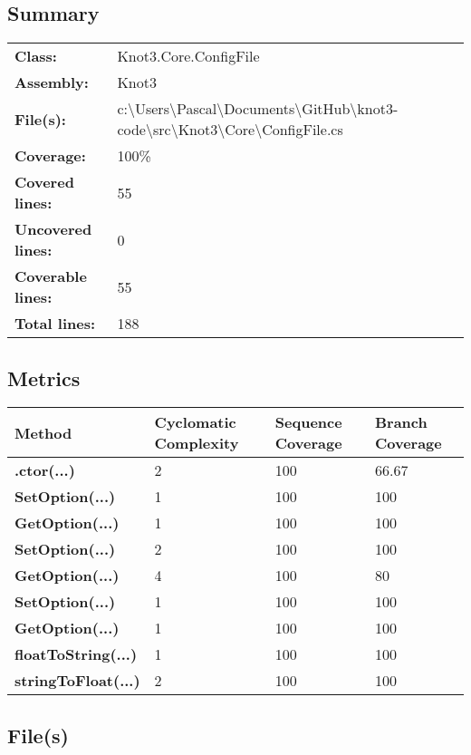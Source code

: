 \documentclass[a4paper,10pt]{article}
\begin{document}
\subsection{Summary}
\begin{longtable}[l]{ll}
\textbf{Class:} & Knot3.Core.ConfigFile\\
\textbf{Assembly:} & Knot3\\
\textbf{File(s):} & \begin{minipage}[t]{12cm}{c:\textbackslash Users\textbackslash Pascal\textbackslash Documents\textbackslash GitHub\textbackslash knot3-code\textbackslash src\textbackslash Knot3\textbackslash Core\textbackslash ConfigFile.cs}\end{minipage} \\
\textbf{Coverage:} & 100\%\\
\textbf{Covered lines:} & 55\\
\textbf{Uncovered lines:} & 0\\
\textbf{Coverable lines:} & 55\\
\textbf{Total lines:} & 188\\
\end{longtable}
\subsection{Metrics}
\begin{longtable}[l]{|l|l|l|l|}
\hline
\textbf{Method} & \textbf{Cyclomatic Complexity} & \textbf{Sequence Coverage} & \textbf{Branch Coverage}\\
\hline
\textbf{.ctor(...)} & 2 & 100 & 66.67\\
\hline
\textbf{SetOption(...)} & 1 & 100 & 100\\
\hline
\textbf{GetOption(...)} & 1 & 100 & 100\\
\hline
\textbf{SetOption(...)} & 2 & 100 & 100\\
\hline
\textbf{GetOption(...)} & 4 & 100 & 80\\
\hline
\textbf{SetOption(...)} & 1 & 100 & 100\\
\hline
\textbf{GetOption(...)} & 1 & 100 & 100\\
\hline
\textbf{floatToString(...)} & 1 & 100 & 100\\
\hline
\textbf{stringToFloat(...)} & 2 & 100 & 100\\
\hline
\end{longtable}
\subsection{File(s)}
\end{document}

